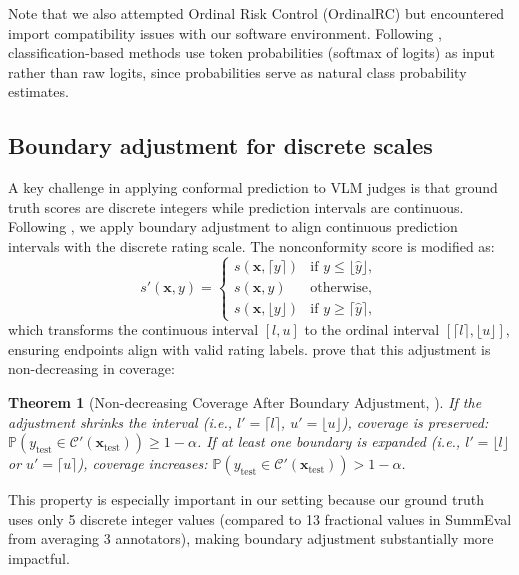\documentclass{article}
\newtheorem{theorem}{Theorem}
\begin{document}
Note that we also attempted Ordinal Risk Control (OrdinalRC) but encountered import compatibility issues with our software environment. Following \citet{sheng2025analyzing}, classification-based methods use token probabilities (softmax of logits) as input rather than raw logits, since probabilities serve as natural class probability estimates.

\subsection{Boundary adjustment for discrete scales}
\label{sec:boundary}

A key challenge in applying conformal prediction to VLM judges is that ground truth scores are discrete integers while prediction intervals are continuous. Following \citet{sheng2025analyzing}, we apply boundary adjustment to align continuous prediction intervals with the discrete rating scale. The nonconformity score is modified as:
\begin{equation}
s'(\mathbf{x}, y) = \begin{cases}
s(\mathbf{x}, \lceil y \rceil) & \text{if } y \leq \lfloor \hat{y} \rfloor, \\
s(\mathbf{x}, y) & \text{otherwise,} \\
s(\mathbf{x}, \lfloor y \rfloor) & \text{if } y \geq \lceil \hat{y} \rceil,
\end{cases}
\end{equation}
which transforms the continuous interval $[l, u]$ to the ordinal interval $[\lceil l \rceil, \lfloor u \rfloor]$, ensuring endpoints align with valid rating labels. \citet{sheng2025analyzing} prove that this adjustment is non-decreasing in coverage:

\begin{theorem}[Non-decreasing Coverage After Boundary Adjustment, \citealp{sheng2025analyzing}]
If the adjustment shrinks the interval (i.e., $l' = \lceil l \rceil$, $u' = \lfloor u \rfloor$), coverage is preserved: $\mathbb{P}(y_\text{test} \in \mathcal{C}'(\mathbf{x}_\text{test})) \geq 1 - \alpha$. If at least one boundary is expanded (i.e., $l' = \lfloor l \rfloor$ or $u' = \lceil u \rceil$), coverage increases: $\mathbb{P}(y_\text{test} \in \mathcal{C}'(\mathbf{x}_\text{test})) > 1 - \alpha$.
\end{theorem}

This property is especially important in our setting because our ground truth uses only 5 discrete integer values (compared to 13 fractional values in SummEval from averaging 3 annotators), making boundary adjustment substantially more impactful.
\end{document}
